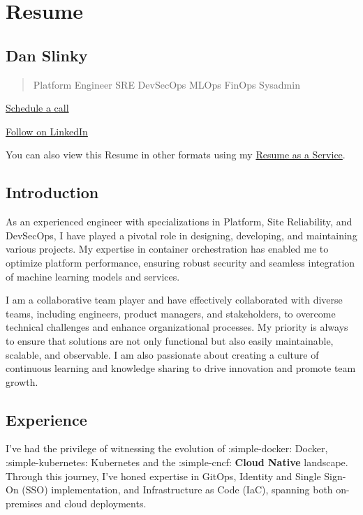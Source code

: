 \documentclass[
]{article}
\author{}
\date{}
\begin{document}
\hypertarget{resume}{%
\section{Resume}\label{resume}}

\hypertarget{dan-slinky}{%
\subsection{Dan Slinky}\label{dan-slinky}}

\begin{quote}
Platform Engineer \textbar{} SRE \textbar{} DevSecOps \textbar{} MLOps
\textbar{} FinOps \textbar{} Sysadmin
\end{quote}

\href{https://cal.com/danslinky}{Schedule a call}

\href{https://linkedin.com/in/danslinky}{Follow on LinkedIn}

You can also view this Resume in other formats using my
\href{/resumes}{Resume as a Service}.

\hypertarget{introduction}{%
\subsection{Introduction}\label{introduction}}

As an experienced engineer with specializations in Platform, Site
Reliability, and DevSecOps, I have played a pivotal role in designing,
developing, and maintaining various projects. My expertise in container
orchestration has enabled me to optimize platform performance, ensuring
robust security and seamless integration of machine learning models and
services.

I am a collaborative team player and have effectively collaborated with
diverse teams, including engineers, product managers, and stakeholders,
to overcome technical challenges and enhance organizational processes.
My priority is always to ensure that solutions are not only functional
but also easily maintainable, scalable, and observable. I am also
passionate about creating a culture of continuous learning and knowledge
sharing to drive innovation and promote team growth.

\hypertarget{experience}{%
\subsection{Experience}\label{experience}}

I've had the privilege of witnessing the evolution of :simple-docker:
Docker, :simple-kubernetes: Kubernetes and the :simple-cncf:
\textbf{Cloud Native} landscape. Through this journey, I've honed
expertise in GitOps, Identity and Single Sign-On (SSO) implementation,
and Infrastructure as Code (IaC), spanning both on-premises and cloud
deployments.
\end{document}
